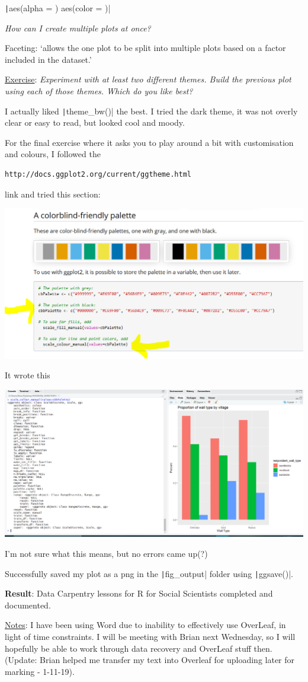 \documentclass{article}
\begin{document}
\texttt|aes(alpha = ) aes(color = )|

\textit{How can I create multiple plots at once?}

Faceting: `allows the one plot to be split into multiple plots based on a factor included in the dataset.’

\underline{Exercise}: \textit{Experiment with at least two different themes. Build the previous plot using each of those themes. Which do you like best?}

I actually liked \texttt|theme_bw()| the best. I tried the dark theme, it was not overly clear or easy to read, but looked cool and moody.

{\item For the final exercise where it asks you to play around a bit with customisation and colours, I followed the}
\begin{verbatim}http://docs.ggplot2.org/current/ggtheme.html\end{verbatim}
link and tried this section:

\includegraphics[width=1.0\textwidth]{rstudio_27.PNG}

It wrote this

\includegraphics[width=1.0\textwidth]{rstudio_28.PNG}

I’m not sure what this means, but no errors came up(?)

Successfully saved my plot as a png in the \texttt|fig_output| folder using \texttt|ggsave()|.

\textbf{Result}: Data Carpentry lessons for R for Social Scientists completed and documented.

\underline{Notes}: I have been using Word due to inability to effectively use OverLeaf, in light of time constraints. I will be meeting with Brian next Wednesday, so I will hopefully be able to work through data recovery and OverLeaf stuff then. (Update: Brian helped me transfer my text into Overleaf for uploading later for marking - 1-11-19).
\end{document}
